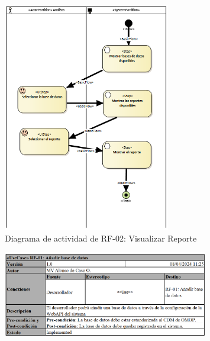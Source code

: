 \begin{figure}[H]
    \centering
    \includegraphics[width=0.65\textwidth]{figures/FR02.png}
    \caption{Diagrama de actividad de RF-02: Visualizar Reporte}
    \label{fig:FR02}
\end{figure}

\begin{figure}[H]
    \centering
    \includegraphics[width=0.80\textwidth]{tables/RF02tab.png}
    \label{table:RF02tab}
\end{figure}

